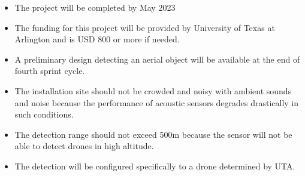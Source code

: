 \begin{itemize}
  \item The project will be completed by May 2023
  \item The funding for this project will be provided by University of Texas at Arlington and is USD 800 or more if needed.
  \item A preliminary design detecting an aerial object will be available at the end of fourth sprint cycle.
  \item The installation site should not be crowded and noisy with ambient sounds and noise because the performance of acoustic sensors degrades drastically in such conditions.
  \item The detection range should not exceed 500m because the sensor will not be able to detect drones in high altitude. 
  \item The detection will be configured specifically to a drone determined by UTA.
\end{itemize}

